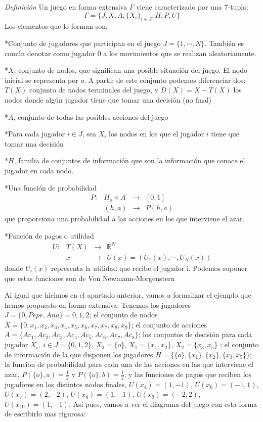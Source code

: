 \documentclass[12pt,a4paper,]{book}
\numberwithin{dummy}{section}
\theoremstyle{ocrenumbox}
\theoremstyle{blacknumex}
\theoremstyle{blacknumbox}
\theoremstyle{ocrenum}
\theoremstyle{ocrenum}
\begin{document}
\emph{Definición} Un juego en forma extensiva \(\Gamma\) viene
caracterizado por una 7-tupla:
\[\Gamma=\{J,X,A,\{X_i\}_{i \in J},H,P,U \}\] Los elementos que lo
forman son:

*Conjunto de jugadores que participan en el juego \(J=\{1,\cdots,N\}\).
También es común denotar como jugador 0 a los movimientos que se
realizan aleatoriamente.

*\(X\), conjunto de nodos, que significan una posible situación del
juego. El nodo inicial se representa por \(o\). A partir de este
conjunto podemos diferenciar dos: \(T(X)\) conjunto de nodos terminales
del juego, y \(D(X)=X-T(X)\) los nodos donde algún jugador tiene que
tomar una decisión (no final)

*\(A\), conjunto de todas las posibles acciones del juego

*Para cada jugador \(i \in J\), sea \(X_i\) los nodos en los que el
jugador \(i\) tiene que tomar una decisión

*\(H\), familia de conjuntos de información que son la información que
conoce el jugador en cada nodo.

*Una función de probabilidad \[
\begin{array}{cccc}
P : & H_o \times A & \rightarrow & [0,1] \\
   &  (h,a) & \rightarrow   & P(h,a)
\end{array}
\] que proporciona una probabilidad a las acciones en los que interviene
el azar.

*Función de pagos o utilidad \[
\begin{array}{cccc}
U: & T(X) & \rightarrow & \mathbb{R}^N \\
   &  x & \rightarrow   & U(x)=(U_1(x),\cdots,U_N(x))
\end{array}
\] donde \(U_i(x)\) representa la utilidad que recibe el jugador i.
Podemos suponer que estas funciones son de Von Newmann-Morgenstern

Al igual que hicimos en el apartado anterior, vamos a formalizar el
ejemplo que hemos propuesto en forma extensiva: Tenemos los jugadores
\(J=\{0, Pepe, Ana\} = {0,1,2}\); el conjunto de nodos
\(X=\{0,x_1,x_2,x_3,x_4,x_5,x_6,x_7,x_7,x_8,x_9 \}\); el conjunto de
acciones \(A=\{Ac_1,Ac_2,Ac_3,Ac_4,Ac_5,Ac_6,Ac_7,Ac_8 \}\); los
conjuntos de decisión para cada jugador \(X_i, \ i \in J=\{0,1,2\}\),
\(X_0=\{o \}\), \(X_1=\{x_1,x_2 \}\), \(X_2= \{x_3,x_5 \}\) ; el
conjunto de información de la que disponen los jugadores
\(H=\{ \{o\}, \{x_1\},\{x_2\}, \{x_3,x_5\} \}\); la funcion de
probabilidad para cada una de las acciones en las que interviene el
azar, \(P(\{o\},a)=\frac{1}{2}\) y \(P(\{o\},b)=\frac{1}{2}\); y las
funciones de pagos que reciben los jugadores en los distintos nodos
finales, \(U(x_4)=(1,-1)\), \(U(x_6)=(-1,1)\), \(U(x_7)=(2,-2)\),
\(U(x_8)=(1,-1)\), \(U(x_9)=(-2,2)\), \(U(x_10)=(1,-1)\). Así pues,
vamos a ver el diagrama del juego con esta forma de escribirlo mas
rigurosa:
\end{document}
